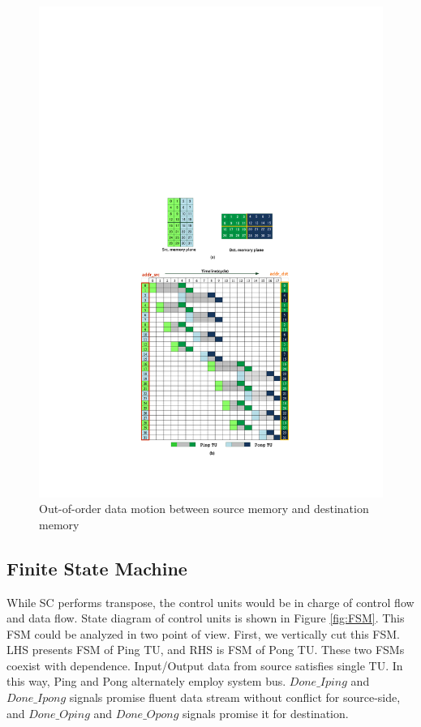 \documentclass[10pt,journal,compsoc]{IEEEtran}
\begin{document}
\begin{figure}[bt]
\begin{center}
\graphicspath{{picture/}}
\includegraphics[scale=0.65]{Out_of_Order_Example_v03}
\caption{Out-of-order data motion between source memory and destination memory}
\label{fig:Out-of-Order_Example}
\end{center}
\end{figure}


\subsection{Finite State Machine }
While SC performs transpose, the control units would be in charge of control flow and data flow. State diagram of control units is shown in Figure \ref{fig:FSM}.
This FSM could be analyzed in two point of view.
First, we vertically cut this FSM.
LHS presents FSM of Ping TU, and RHS is FSM of Pong TU. These two FSMs coexist with dependence. Input/Output data from source satisfies single TU.
In this way, Ping and Pong alternately employ system bus. $ Done\_Iping $ and $  Done\_Ipong $ signals promise fluent data stream without conflict for source-side,
and $ Done\_Oping $ and $  Done\_Opong $ signals promise it for destination.
\end{document}
